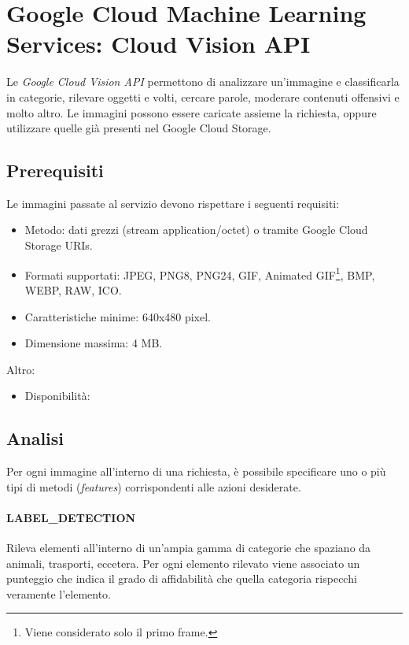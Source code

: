 \section{Google Cloud Machine Learning Services: Cloud Vision API}
Le \textit{Google Cloud Vision API} \cite{google-api} permettono di analizzare un'immagine e classificarla in categorie, rilevare oggetti e volti, cercare parole,
moderare contenuti offensivi e molto altro. Le immagini possono essere caricate assieme la richiesta, oppure utilizzare quelle già presenti nel Google Cloud Storage. 

\subsection{Prerequisiti}
Le immagini passate al servizio devono rispettare i seguenti requisiti:
\begin{itemize}
\item Metodo: dati grezzi (stream application/octet) o tramite Google Cloud Storage URIs.
\item Formati supportati: JPEG, PNG8, PNG24, GIF, Animated GIF\footnote{Viene considerato solo il primo frame.},
BMP, WEBP, RAW, ICO.
\item Caratteristiche minime: 640x480 pixel. 
\item Dimensione massima: 4 MB.
\end{itemize}
Altro:
\begin{itemize}
\item Disponibilità: %
\end{itemize}

\subsection{Analisi}
Per ogni immagine all'interno di una richiesta, è possibile specificare uno o più tipi di metodi (\textit{features}) corrispondenti alle azioni desiderate.
\paragraph{\textsf{LABEL\_DETECTION}} Rileva elementi all'interno di un'ampia gamma di categorie che spaziano da animali, trasporti, eccetera.
Per ogni elemento rilevato viene associato un punteggio che indica il grado di affidabilità che quella categoria rispecchi veramente l'elemento.
%
